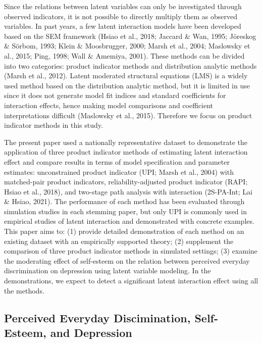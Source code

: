 \documentclass[
  man]{apa7}
\begin{document}
Since the relations between latent variables can only be investigated through observed indicators, it is not possible to directly multiply them as observed variables. In past years, a few latent interaction models have been developed based on the SEM framework (Hsiao et al., 2018; Jaccard \& Wan, 1995; Jöreskog \& Sörbom, 1993; Klein \& Moosbrugger, 2000; Marsh et al., 2004; Maslowsky et al., 2015; Ping, 1998; Wall \& Amemiya, 2001). These methods can be divided into two categories: product indicator methods and distribution analytic methods (Marsh et al., 2012). Latent moderated structural equations (LMS) is a widely used method based on the distribution analytic method, but it is limited in use since it does not generate model fit indices and standard coefficients for interaction effects, hence making model comparisons and coefficient interpretations difficult (Maslowsky et al., 2015). Therefore we focus on product indicator methods in this study.

The present paper used a nationally representative dataset to demonstrate the application of three product indicator methods of estimating latent interaction effect and compare results in terms of model specification and parameter estimates: unconstrained product indicator (UPI; Marsh et al., 2004) with matched-pair product indicators, reliability-adjusted product indicator (RAPI; Hsiao et al., 2018), and two-stage path analysis with interaction (2S-PA-Int; Lai \& Hsiao, 2021). The performance of each method has been evaluated through simulation studies in each stemming paper, but only UPI is commonly used in empirical studies of latent interaction and demonstrated with concrete examples. This paper aims to: (1) provide detailed demonstration of each method on an existing dataset with an empirically supported theory; (2) supplement the comparison of three product indicator methods in simulated settings; (3) examine the moderating effect of self-esteem on the relation between perceived everyday discrimination on depression using latent variable modeling. In the demonstrations, we expect to detect a significant latent interaction effect using all the methods.

\hypertarget{perceived-everyday-discimination-self-esteem-and-depression}{%
\subsection{Perceived Everyday Discimination, Self-Esteem, and Depression}\label{perceived-everyday-discimination-self-esteem-and-depression}}
\end{document}
